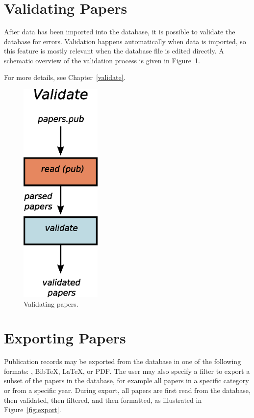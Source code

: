 \section{Validating Papers}

After data has been imported into the database, it is possible to
validate the database for errors. Validation happens automatically
when data is imported, so this feature is mostly relevant when the
database file is edited directly. A schematic overview of the
validation process is given in Figure~\ref{fig:validate}.

For more details, see Chapter~\ref{validate}.

\begin{figure}[htbp]
  \begin{center}
    \includegraphics[width=4cm]{images/validate.eps}
    \caption{Validating papers.}
    \label{fig:validate}
  \end{center}
\end{figure}

\section{Exporting Papers}

Publication records may be exported from the database in one of the
following formats: , BibTeX, \LaTeX, or PDF. The
user may also specify a filter to export a subset of the papers in the
database, for example all papers in a specific category or from a
specific year.  During export, all papers are first read from the
database, then validated, then filtered, and then formatted, as
illustrated in Figure~\ref{fig:export}.

